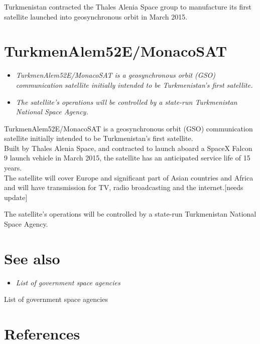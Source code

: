 Turkmenistan contracted the Thales Alenia Space group to manufacture its
first satellite launched into geosynchronous orbit in March 2015.

\section{TurkmenAlem52E/MonacoSAT}\label{turkmenalem52emonacosat}

\begin{itemize}
\item
  \emph{TurkmenAlem52E/MonacoSAT is a geosynchronous orbit (GSO)
  communication satellite initially intended to be Turkmenistan's first
  satellite.}
\item
  \emph{The satellite's operations will be controlled by a state-run
  Turkmenistan National Space Agency.}
\end{itemize}

TurkmenAlem52E/MonacoSAT is a geosynchronous orbit (GSO) communication
satellite initially intended to be Turkmenistan's first satellite.\\
Built by Thales Alenia Space, and contracted to launch aboard a SpaceX
Falcon 9 launch vehicle in March 2015, the satellite has an anticipated
service life of 15 years.\\
The satellite will cover Europe and significant part of Asian countries
and Africa and will have transmission for TV, radio broadcasting and the
internet.{[}needs update{]}

The satellite's operations will be controlled by a state-run
Turkmenistan National Space Agency.

\section{See also}\label{see-also}

\begin{itemize}
\item
  \emph{List of government space agencies}
\end{itemize}

List of government space agencies

\section{References}\label{references}
